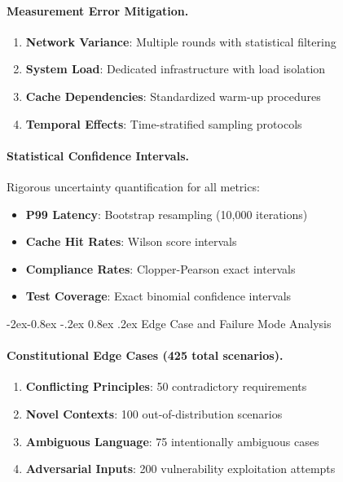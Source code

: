 \documentclass[manuscript,screen,9pt]{acmart}
\makeatletter
\renewcommand\subsubsection{\@startsection{subsubsection}{3}{\z@}%
  {-2ex\@plus -0.8ex \@minus -.2ex}%
  {0.8ex \@plus .2ex}%
  {\normalfont\normalsize\bfseries}}
\makeatother
\begin{document}
\paragraph{Measurement Error Mitigation.}
\begin{enumerate}[leftmargin=*,itemsep=1pt,parsep=1pt]
	\item \textbf{Network Variance}: Multiple rounds with statistical filtering
	\item \textbf{System Load}: Dedicated infrastructure with load isolation
	\item \textbf{Cache Dependencies}: Standardized warm-up procedures
	\item \textbf{Temporal Effects}: Time-stratified sampling protocols
\end{enumerate}

\paragraph{Statistical Confidence Intervals.}
Rigorous uncertainty quantification for all metrics:
\begin{itemize}[leftmargin=*,itemsep=1pt,parsep=1pt]
	\item \textbf{P99 Latency}: Bootstrap resampling (10,000 iterations)
	\item \textbf{Cache Hit Rates}: Wilson score intervals
	\item \textbf{Compliance Rates}: Clopper-Pearson exact intervals
	\item \textbf{Test Coverage}: Exact binomial confidence intervals
\end{itemize}

\subsubsection{Edge Case and Failure Mode Analysis}
\label{subsubsec:edge_case_analysis}

\paragraph{Constitutional Edge Cases (425 total scenarios).}
\begin{enumerate}[leftmargin=*,itemsep=1pt,parsep=1pt]
	\item \textbf{Conflicting Principles}: 50 contradictory requirements
	\item \textbf{Novel Contexts}: 100 out-of-distribution scenarios
	\item \textbf{Ambiguous Language}: 75 intentionally ambiguous cases
	\item \textbf{Adversarial Inputs}: 200 vulnerability exploitation attempts
\end{enumerate}
\end{document}
